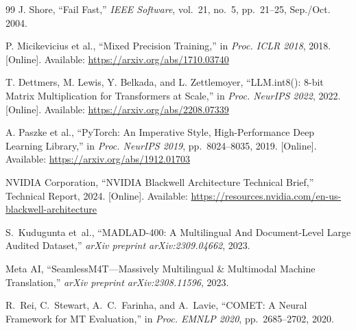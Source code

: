 \documentclass[journal]{IEEEtran}
\begin{document}
\begin{thebibliography}{99}
J. Shore, ``Fail Fast,''
\textit{IEEE Software}, vol.~21, no.~5, pp.~21--25, Sep./Oct. 2004.

P. Micikevicius et al., ``Mixed Precision Training,''
in \textit{Proc. ICLR 2018}, 2018.
[Online]. Available: \url{https://arxiv.org/abs/1710.03740}

T. Dettmers, M. Lewis, Y. Belkada, and L. Zettlemoyer,
``LLM.int8(): 8-bit Matrix Multiplication for Transformers at Scale,''
in \textit{Proc. NeurIPS 2022}, 2022.
[Online]. Available: \url{https://arxiv.org/abs/2208.07339}

A. Paszke et al., ``PyTorch: An Imperative Style, High-Performance Deep Learning Library,''
in \textit{Proc. NeurIPS 2019}, pp.~8024--8035, 2019.
[Online]. Available: \url{https://arxiv.org/abs/1912.01703}

NVIDIA Corporation, ``NVIDIA Blackwell Architecture Technical Brief,''
Technical Report, 2024.
[Online]. Available: \url{https://resources.nvidia.com/en-us-blackwell-architecture}

S.~Kudugunta et~al.,
``MADLAD-400: A Multilingual And Document-Level Large Audited Dataset,''
\textit{arXiv preprint arXiv:2309.04662}, 2023.

Meta AI,
``SeamlessM4T---Massively Multilingual \& Multimodal Machine Translation,''
\textit{arXiv preprint arXiv:2308.11596}, 2023.

R.~Rei, C.~Stewart, A.~C.~Farinha, and A.~Lavie,
``COMET: A Neural Framework for MT Evaluation,''
in \textit{Proc. EMNLP 2020}, pp.~2685--2702, 2020.

\end{thebibliography}
\end{document}
